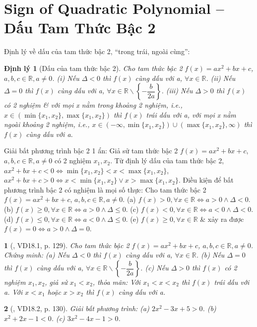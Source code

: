 \documentclass{article}
\newtheorem{baitoan}{}
\newtheorem{dinhly}{Định lý}
\begin{document}
\section{Sign of Quadratic Polynomial -- Dấu Tam Thức Bậc 2}
 Định lý về dấu của tam thức bậc 2, ``trong trái, ngoài cùng'':
\begin{dinhly}[Dấu của tam thức bậc 2]
	Cho tam thức bậc 2 $f(x) = ax^2 + bx + c$, $a,b,c\in\mathbb{R},a\ne0$. (i) Nếu $\Delta < 0$ thì $f(x)$ cùng dấu với a, $\forall x\in\mathbb{R}$. (ii) Nếu $\Delta = 0$ thì $f(x)$ cùng dấu với a, $\forall x\in\mathbb{R}\backslash\left\{-\dfrac{b}{2a}\right\}$. (iii) Nếu $\Delta > 0$ thì $f(x)$ có 2 nghiệm \& với mọi x nằm trong khoảng 2 nghiệm, i.e., $x\in(\min\{x_1,x_2\},\max\{x_1,x_2\})$ thì $f(x)$ trái dấu với a, với mọi x nằm ngoài khoảng 2 nghiệm, i.e., $x\in(-\infty,\min\{x_1,x_2\})\cup(\max\{x_1,x_2\},\infty)$ thì $f(x)$ cùng dấu với a.
\end{dinhly}
\noindent{} {\sf Giải bất phương trình bậc 2 1 ẩn}: Giả sử tam thức bậc 2 $f(x) = ax^2 + bx + c$, $a,b,c\in\mathbb{R},a\ne0$ có 2 nghiệm $x_1,x_2$. Từ định lý dấu của tam thức bậc 2, $ax^2 + bx + c < 0\Leftrightarrow\min\{x_1,x_2\} < x < \max\{x_1,x_2\}$, $ax^2 + bx + c > 0\Leftrightarrow x < \min\{x_1,x_2\}\lor x > \max\{x_1,x_2\}$.  {\sf Điều kiện để bất phương trình bậc 2 có nghiệm là mọi số thực}: Cho tam thức bậc 2 $f(x) = ax^2 + bx + c$, $a,b,c\in\mathbb{R},a\ne0$. (a) $f(x) > 0,\forall x\in \mathbb{R}\Leftrightarrow a > 0\land\Delta < 0$. (b) $f(x)\ge0,\forall x\in \mathbb{R}\Leftrightarrow a > 0\land\Delta\le0$. (c) $f(x) < 0,\forall x\in \mathbb{R}\Leftrightarrow a < 0\land\Delta < 0$. (d) $f(x)\le0,\forall x\in \mathbb{R}\Leftrightarrow a < 0\land\Delta\le0$. (e) $f(x)\ge0,\forall x\in \mathbb{R}$ \& xảy ra được $f(x) = 0\Leftrightarrow a > 0\land\Delta = 0$.

\begin{baitoan}[\cite{TLCT_THCS_Toan_9_dai_so}, VD18.1, p. 129]
	Cho tam thức bậc 2 $f(x) = ax^2 + bx + c$, $a,b,c\in\mathbb{R},a\ne0$. Chứng minh: (a) Nếu $\Delta < 0$ thì $f(x)$ cùng dấu với a, $\forall x\in \mathbb{R}$. (b) Nếu $\Delta = 0$ thì $f(x)$ cùng dấu với a, $\forall x\in\mathbb{R}\backslash\left\{-\dfrac{b}{2a}\right\}$. (c) Nếu $\Delta > 0$ thì $f(x)$ có 2 nghiệm $x_1,x_2$, giả sử $x_1 < x_2$, thỏa mãn: Với $x_1 < x < x_2$ thì $f(x)$ trái dấu với a. Với $x < x_1$ hoặc $x > x_2$ thì $f(x)$ cùng dấu với a.
\end{baitoan}

\begin{baitoan}[\cite{TLCT_THCS_Toan_9_dai_so}, VD18.2, p. 130]
	Giải bất phương trình: (a) $2x^2 - 3x + 5 > 0$. (b) $x^2 + 2x - 1 < 0$. (c) $3x^2 - 4x - 1 > 0$.
\end{baitoan}
\end{document}
